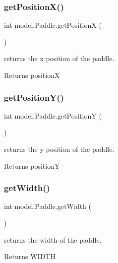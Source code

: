 \subsubsection{\texorpdfstring{get\+Position\+X()}{getPositionX()}}
{\footnotesize\ttfamily int model.\+Paddle.\+get\+PositionX (\begin{DoxyParamCaption}{ }\end{DoxyParamCaption})}



returns the x position of the paddle. 

\begin{DoxyReturn}{Returns}
positionX 
\end{DoxyReturn}
\hypertarget{classmodel_1_1_paddle_aaf41497a40221df4d394f5dea3937498}{}\label{classmodel_1_1_paddle_aaf41497a40221df4d394f5dea3937498} 
\subsubsection{\texorpdfstring{get\+Position\+Y()}{getPositionY()}}
{\footnotesize\ttfamily int model.\+Paddle.\+get\+PositionY (\begin{DoxyParamCaption}{ }\end{DoxyParamCaption})}



returns the y position of the paddle. 

\begin{DoxyReturn}{Returns}
positionY 
\end{DoxyReturn}
\hypertarget{classmodel_1_1_paddle_a47751a93c5d4bdcf59ecf16b86c435b1}{}\label{classmodel_1_1_paddle_a47751a93c5d4bdcf59ecf16b86c435b1} 
\subsubsection{\texorpdfstring{get\+Width()}{getWidth()}}
{\footnotesize\ttfamily int model.\+Paddle.\+get\+Width (\begin{DoxyParamCaption}{ }\end{DoxyParamCaption})}



returns the width of the paddle. 

\begin{DoxyReturn}{Returns}
W\+I\+D\+TH 
\end{DoxyReturn}
\hypertarget{classmodel_1_1_paddle_a717fb74f04387abc1b3633574ba555d0}{}\label{classmodel_1_1_paddle_a717fb74f04387abc1b3633574ba555d0} 
